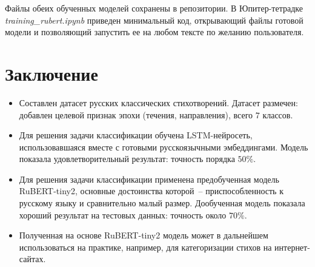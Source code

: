 \documentclass[a4paper,12pt]{article}
\begin{document}
Файлы обеих обученных моделей сохранены в репозитории. В Юпитер-тетрадке \linebreak \textit{training\_rubert.ipynb} приведен минимальный код, открывающий файлы готовой модели и позволяющий запустить ее на любом тексте по желанию пользователя.


\section{Заключение}
\begin{itemize}
    \item Составлен датасет русских классических стихотворений. Датасет размечен: добавлен целевой признак эпохи (течения, направления), всего $7$ классов.
    \item Для решения задачи классификации обучена LSTM-нейросеть, использовавшаяся вместе с готовыми русскоязычными эмбеддингами. Модель показала удовлетворительный результат: точность порядка $50 \%$.
    \item Для решения задачи классификации применена предобученная модель RuBERT-tiny2, основные достоинства которой~-- приспособленность к русскому языку и сравнительно малый размер. Дообученная модель показала хороший результат на тестовых данных: точность около $70 \%$.
    \item Полученная на основе RuBERT-tiny2 модель может в дальнейшем использоваться на практике, например, для категоризации стихов на интернет-сайтах.
\end{itemize}


\begin{otherlanguage}{english}
\printbibliography[
    heading=bibintoc
]
\end{otherlanguage}
\end{document}
